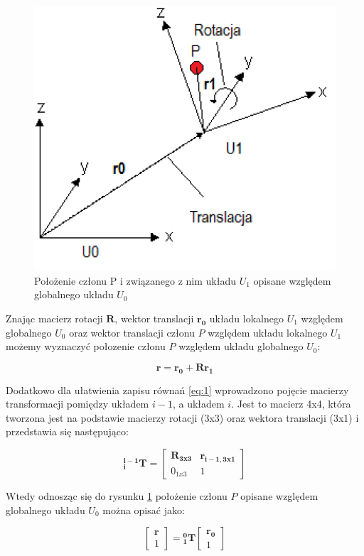 \documentclass[a4paper, 12pt, twoside]{article}
\begin{document}
\begin{figure}[hbt!]
\centering
\includegraphics[width=0.6\linewidth]{images/kinematic_scheme.png}
\caption{Położenie członu P i związanego z nim układu $U_1$ opisane względem globalnego układu $U_0$ }
\label{fig:kinematic_scheme}
\end{figure}

Znając macierz rotacji $\bm{R}$, wektor translacji $\bm{r_0}$ układu lokalnego $U_1$ względem globalnego $U_0$ oraz wektor translacji członu $P$ względem układu lokalnego $U_1$ możemy wyznaczyć połozenie członu $P$ względem układu globalnego $U_0$:

\begin{equation}  \label{eq:1} 
\bm{r} = \bm{r_0} + \bm{R} \bm{r_1}
\end{equation}

Dodatkowo dla ułatwienia zapisu równań \eqref{eq:1} wprowadzono pojęcie macierzy transformacji \cite{systemkozlowski} pomiędzy układem $i-1$, a układem $i$. Jest to macierz 4x4, która tworzona jest na podstawie macierzy rotacji (3x3) oraz wektora translacji (3x1) i przedstawia się następująco:

\begin{equation} \label{eq:2}
\bm{^{i-1}_{i}T} = \begin{bmatrix} 
				   \bm{R_{3x3}} & \bm{r_{i-1,3x1}} \\
				   0_{1x3} & 1 
				   \end{bmatrix}
\end{equation}

Wtedy odnosząc się do rysunku \ref{fig:kinematic_scheme} położenie członu $P$ opisane względem globalnego układu $U_0$ można opisać jako:

\begin{equation} \label{eq:3}
\begin{bmatrix}
\bm{r} \\
1
\end{bmatrix} = \bm{^{0}_{1}T}\begin{bmatrix}
								\bm{r_0} \\
								1
								\end{bmatrix}
\end{equation}
\end{document}
